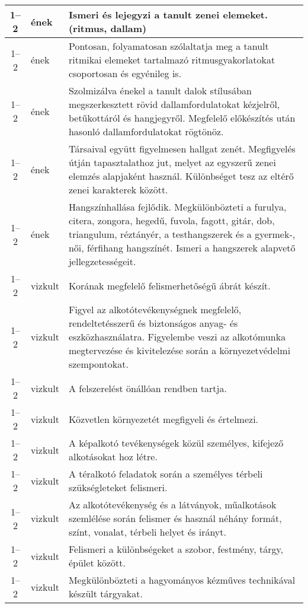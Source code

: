 \begin{small}
\begin{longtable}{c | p{2cm} |  p{11cm} }
              1--2 & ének & Ismeri és lejegyzi a tanult zenei elemeket. (ritmus, dallam) \\ \hline
              1--2 & ének & Pontosan, folyamatosan szólaltatja meg a tanult ritmikai elemeket tartalmazó ritmusgyakorlatokat csoportosan és egyénileg is. \\ \hline
              1--2 & ének & Szolmizálva énekel a tanult dalok stílusában megszerkesztett rövid dallamfordulatokat kézjelről, betűkottáról és hangjegyről. Megfelelő előkészítés után hasonló dallamfordulatokat rögtönöz. \\ \hline
              1--2 & ének & Társaival együtt figyelmesen hallgat zenét. Megfigyelés útján tapasztalathoz jut, melyet az egyszerű zenei elemzés alapjaként használ. Különbséget tesz az eltérő zenei karakterek között. \\ \hline
              1--2 & ének & Hangszínhallása fejlődik. Megkülönbözteti a furulya, citera, zongora, hegedű, fuvola, fagott, gitár, dob, triangulum, réztányér, a testhangszerek és a gyermek-, női, férfihang hangszínét. Ismeri a hangszerek alapvető jellegzetességeit. \\ \hline
              1--2 & vizkult & Korának megfelelő felismerhetőségű ábrát készít. \\ \hline
              1--2 & vizkult & Figyel az alkotótevékenységnek megfelelő, rendeltetésszerű és biztonságos anyag- és eszközhasználatra. Figyelembe veszi az alkotómunka megtervezése és kivitelezése során a környezetvédelmi szempontokat. \\ \hline
              1--2 & vizkult & A felszerelést önállóan rendben tartja. \\ \hline
              1--2 & vizkult & Közvetlen környezetét megfigyeli és értelmezi. \\ \hline
              1--2 & vizkult & A képalkotó tevékenységek közül személyes, kifejező alkotásokat hoz létre. \\ \hline
              1--2 & vizkult & A téralkotó feladatok során a személyes térbeli szükségleteket felismeri. \\ \hline
              1--2 & vizkult & Az alkotótevékenység és a látványok, műalkotások szemlélése során felismer és használ néhány formát, színt, vonalat, térbeli helyet és irányt. \\ \hline
              1--2 & vizkult & Felismeri a különbségeket a szobor, festmény, tárgy, épület között. \\ \hline
              1--2 & vizkult & Megkülönbözteti a hagyományos kézműves technikával készült tárgyakat. \\ \hline

\end{longtable}
\end{small}
